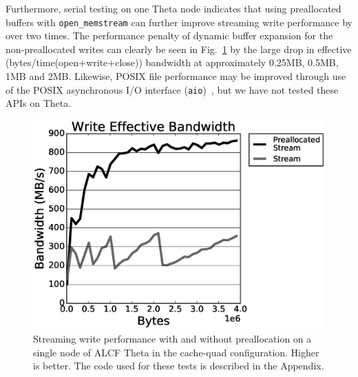 Furthermore, serial testing on one Theta node indicates that using preallocated
buffers with \texttt{open\_memstream} can further improve streaming write
performance by over two times.
The performance penalty of dynamic buffer expansion for the non-preallocated
writes can clearly be seen in Fig.~\ref{fig:prealloc} by the large drop in
effective (bytes/time(open+write+close)) bandwidth at approximately 0.25MB, 0.5MB,
1MB and 2MB.
Likewise, POSIX file performance may be improved through use of the POSIX
asynchronous I/O interface (\texttt{aio})~\cite{bhattacharya2003asynchronous},
but we have not tested these APIs on Theta.

\begin{figure} \centering
  \includegraphics[width=.55\textwidth]{results/streamPrealloc/streamPreallocWriteEffectiveBandwidth.eps}
  \caption{
    Streaming write performance with and without preallocation on a single node
    of ALCF Theta in the cache-quad configuration.
    Higher is better.
    The code used for these tests is described in the Appendix.
  }
  \label{fig:prealloc}
\end{figure}

